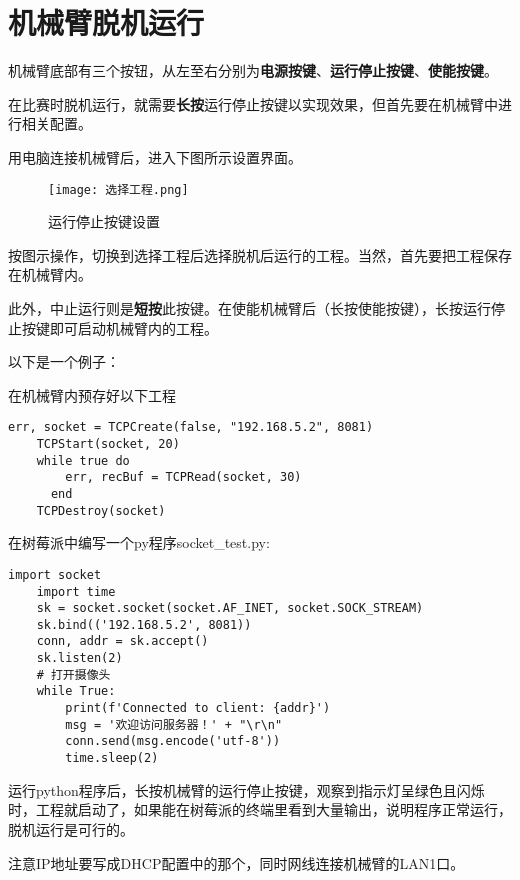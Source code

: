 \section{机械臂脱机运行}
机械臂底部有三个按钮，从左至右分别为\textbf{电源按键}、\textbf{运行停止按键}、\textbf{使能按键}。
\par
在比赛时脱机运行，就需要\textbf{长按}运行停止按键以实现效果，但首先要在机械臂中进行相关配置。
\par
用电脑连接机械臂后，进入下图所示设置界面。
\begin{figure}[H]
	\centering
	\texttt{[image: 选择工程.png]}
	\caption{运行停止按键设置}
	\label{fig:example}
\end{figure}
按图示操作，切换到选择工程后选择脱机后运行的工程。当然，首先要把工程保存在机械臂内。
\par
此外，中止运行则是\textbf{短按}此按键。在使能机械臂后（长按使能按键），长按运行停止按键即可启动机械臂内的工程。
\par
以下是一个例子：
\par
在机械臂内预存好以下工程
\begin{lstlisting}[style=luastyle]
	err, socket = TCPCreate(false, "192.168.5.2", 8081)
	TCPStart(socket, 20)
	while true do
		err, recBuf = TCPRead(socket, 30)
	  end
	TCPDestroy(socket)
\end{lstlisting}
\par
在树莓派中编写一个py程序socket\_test.py:
\begin{lstlisting}[style=pythonstyle]
	import socket
	import time
	sk = socket.socket(socket.AF_INET, socket.SOCK_STREAM)
	sk.bind(('192.168.5.2', 8081))
	conn, addr = sk.accept()
	sk.listen(2)
	# 打开摄像头
	while True:
		print(f'Connected to client: {addr}')
		msg = '欢迎访问服务器！' + "\r\n"
		conn.send(msg.encode('utf-8'))
		time.sleep(2)
\end{lstlisting}
\par
运行python程序后，长按机械臂的运行停止按键，观察到指示灯呈绿色且闪烁时，工程就启动了，如果能在树莓派的终端里看到大量输出，说明程序正常运行，脱机运行是可行的。
\par
注意IP地址要写成DHCP配置中的那个，同时网线连接机械臂的LAN1口。